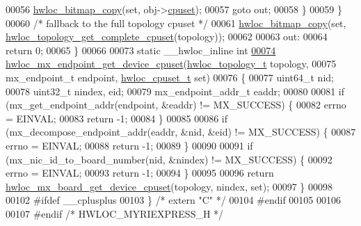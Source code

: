 \begin{DoxyCode}
00056         \hyperlink{a00065_gab14743355fa03b36cef521cbcd2fbf64}{hwloc_bitmap_copy}(\textcolor{keyword}{set}, obj->\hyperlink{a00016_a67925e0f2c47f50408fbdb9bddd0790f}{cpuset});
00057         \textcolor{keywordflow}{goto} out;
00058       \}
00059   \}
00060   \textcolor{comment}{/* fallback to the full topology cpuset */}
00061   \hyperlink{a00065_gab14743355fa03b36cef521cbcd2fbf64}{hwloc_bitmap_copy}(\textcolor{keyword}{set}, \hyperlink{a00060_ga418ebb39eaf1eac8f9cf4047cf59a534}{hwloc_topology_get_complete_cpuset}(topology));
00062 
00063  out:
00064   \textcolor{keywordflow}{return} 0;
00065 \}
00066 
00073 \textcolor{keyword}{static} \_\_hwloc\_inline \textcolor{keywordtype}{int}
\hypertarget{a00036_source_l00074}{}\hyperlink{a00074_ga2ff7763b9c2c5975f9a2e3d638351535}{00074} \hyperlink{a00074_ga2ff7763b9c2c5975f9a2e3d638351535}{hwloc_mx_endpoint_get_device_cpuset}(\hyperlink{a00039_ga9d1e76ee15a7dee158b786c30b6a6e38}{hwloc_topology_t} topology,
00075                                     mx\_endpoint\_t endpoint, \hyperlink{a00040_ga4bbf39b68b6f568fb92739e7c0ea7801}{hwloc_cpuset_t} \textcolor{keyword}{set})
00076 \{
00077   uint64\_t nid;
00078   uint32\_t nindex, eid;
00079   mx\_endpoint\_addr\_t eaddr;
00080 
00081   \textcolor{keywordflow}{if} (mx\_get\_endpoint\_addr(endpoint, &eaddr) != MX\_SUCCESS) \{
00082     errno = EINVAL;
00083     \textcolor{keywordflow}{return} -1;
00084   \}
00085 
00086   \textcolor{keywordflow}{if} (mx\_decompose\_endpoint\_addr(eaddr, &nid, &eid) != MX\_SUCCESS) \{
00087     errno = EINVAL;
00088     \textcolor{keywordflow}{return} -1;
00089   \}
00090 
00091   \textcolor{keywordflow}{if} (mx\_nic\_id\_to\_board\_number(nid, &nindex) != MX\_SUCCESS) \{
00092     errno = EINVAL;
00093     \textcolor{keywordflow}{return} -1;
00094   \}
00095 
00096   \textcolor{keywordflow}{return} \hyperlink{a00074_ga87f4746d0cad579ce4e86b98088f22a1}{hwloc_mx_board_get_device_cpuset}(topology, nindex, \textcolor{keyword}{set});
00097 \}
00098 
00102 \textcolor{preprocessor}{#ifdef \_\_cplusplus}
00103 \textcolor{preprocessor}{}\} \textcolor{comment}{/* extern "C" */}
00104 \textcolor{preprocessor}{#endif}
00105 \textcolor{preprocessor}{}
00106 
00107 \textcolor{preprocessor}{#endif }\textcolor{comment}{/* HWLOC\_MYRIEXPRESS\_H */}
\end{DoxyCode}
